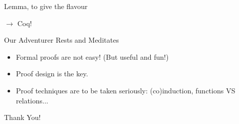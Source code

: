 \documentclass[xcolor={dvipsnames}]{beamer}
\begin{document}
\begin{frame}{Lemma, to give the flavour}

$\longrightarrow$ Coq!

\end{frame}

\begin{frame}{Our Adventurer Rests and Meditates}

  \begin{small}

    \begin{itemize}
    \item Formal proofs are not easy! (But useful and fun!)
    \item Proof design is the key.
    \item Proof techniques are to be taken seriously: (co)induction, functions VS relations...
    \end{itemize}

  \end{small}


\end{frame}
\begin{frame}

  \begin{center}
    Thank You!
  \end{center}

\end{frame}
\end{document}
